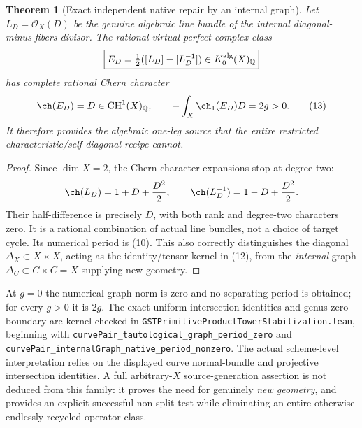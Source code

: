 \documentclass[11pt]{article}
\newcommand{\Q}{\mathbb Q}
\newcommand{\CH}{\operatorname{CH}}
\newtheorem{theorem}{Theorem}
\begin{document}
\begin{theorem}[Exact independent native repair by an internal graph]
\label{th:graph-repair}
Let \(L_D=\mathcal O_X(D)\) be the \emph{genuine} algebraic
line bundle of the internal diagonal-minus-fibers divisor.
The rational virtual perfect-complex class
\[
       \boxed{E_D=\tfrac12([L_D]-[L_D^{-1}])
               \in K_0^{\rm alg}(X)_\Q}
\]
has complete rational Chern character
\[
                  \ch(E_D)=D\in\CH^1(X)_\Q,
          \qquad -\int_X \ch_1(E_D)D=2g>0.           \tag{13}
\]
It therefore provides the algebraic one-leg source that
the entire restricted characteristic/self-diagonal recipe cannot.
\end{theorem}
\begin{proof}
Since \(\dim X=2\), the Chern-character expansions stop at
degree two:
\[
 \ch(L_D)=1+D+\frac{D^2}{2},\qquad
 \ch(L_D^{-1})=1-D+\frac{D^2}{2}.
\]
Their half-difference is precisely \(D\), with both rank and
degree-two characters zero. It is a rational combination
of actual line bundles, not a choice of target cycle.
Its numerical period is (10). This also correctly distinguishes
the diagonal \(\Delta_X\subset X\times X\), acting as the
identity/tensor kernel in (12), from the \emph{internal}
graph \(\Delta_C\subset C\times C=X\) supplying new geometry.
\end{proof}

At \(g=0\) the numerical graph norm is zero and no separating
period is obtained; for every \(g>0\) it is \(2g\).
The exact uniform intersection identities and genus-zero boundary
are kernel-checked in
\texttt{GSTPrimitiveProductTowerStabilization.lean}, beginning
with \texttt{curvePair\_tautological\_graph\_period\_zero} and
\texttt{curvePair\_internalGraph\_native\_period\_nonzero}.
The actual scheme-level interpretation relies on the displayed
curve normal-bundle and projective intersection identities.
A full arbitrary-\(X\) source-generation assertion is not
deduced from this family: it proves the need for genuinely
\emph{new geometry}, and provides an explicit successful non-split
test while eliminating an entire otherwise endlessly recycled
operator class.
\end{document}
